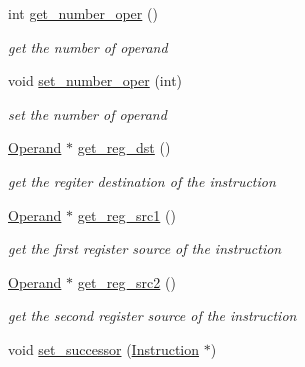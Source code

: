\begin{DoxyCompactItemize}
int \hyperlink{classInstruction_acc1449841171a23e873e32077cd7b835}{get\_\-number\_\-oper} ()
\begin{DoxyCompactList}\small\item\em get the number of operand \item\end{DoxyCompactList}\item 
\hypertarget{classInstruction_a6ff2d531dffa43d3db22194459336d33}{
void \hyperlink{classInstruction_a6ff2d531dffa43d3db22194459336d33}{set\_\-number\_\-oper} (int)}
\label{classInstruction_a6ff2d531dffa43d3db22194459336d33}

\begin{DoxyCompactList}\small\item\em set the number of operand \item\end{DoxyCompactList}\item 
\hypertarget{classInstruction_adeb2225adf1294116a0afb6ae8c5e8ea}{
\hyperlink{classOperand}{Operand} $\ast$ \hyperlink{classInstruction_adeb2225adf1294116a0afb6ae8c5e8ea}{get\_\-reg\_\-dst} ()}
\label{classInstruction_adeb2225adf1294116a0afb6ae8c5e8ea}

\begin{DoxyCompactList}\small\item\em get the regiter destination of the instruction \item\end{DoxyCompactList}\item 
\hypertarget{classInstruction_a4613a89ad801469054d4db09d41b5461}{
\hyperlink{classOperand}{Operand} $\ast$ \hyperlink{classInstruction_a4613a89ad801469054d4db09d41b5461}{get\_\-reg\_\-src1} ()}
\label{classInstruction_a4613a89ad801469054d4db09d41b5461}

\begin{DoxyCompactList}\small\item\em get the first register source of the instruction \item\end{DoxyCompactList}\item 
\hypertarget{classInstruction_ac993d761f03722062bca539c9d149918}{
\hyperlink{classOperand}{Operand} $\ast$ \hyperlink{classInstruction_ac993d761f03722062bca539c9d149918}{get\_\-reg\_\-src2} ()}
\label{classInstruction_ac993d761f03722062bca539c9d149918}

\begin{DoxyCompactList}\small\item\em get the second register source of the instruction \item\end{DoxyCompactList}\item 
\hypertarget{classInstruction_a21d25bd9eba2f5f4593803d047cd22d8}{
void \hyperlink{classInstruction_a21d25bd9eba2f5f4593803d047cd22d8}{set\_\-successor} (\hyperlink{classInstruction}{Instruction} $\ast$)}
\label{classInstruction_a21d25bd9eba2f5f4593803d047cd22d8}


\end{DoxyCompactItemize}
